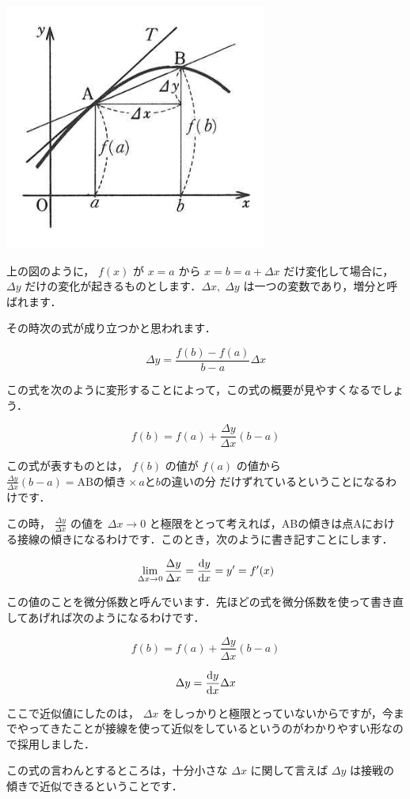 \documentclass[
  b4paperpaper,
  xelatex,ja=standard]{bxjsbook}
\begin{document}
\includegraphics{source/images/intro/intro-1.png}

上の図のように， \(f(x)\) が \(x=a\) から \(x=b=a+\Delta x\)
だけ変化して場合に， \(\Delta y\)
だけの変化が起きるものとします．\(\Delta x,\; \Delta y\)
は一つの変数であり，増分と呼ばれます．

その時次の式が成り立つかと思われます．

\[\Delta y = \frac{f(b)-f(a)}{b-a} \Delta x\]

この式を次のように変形することによって，この式の概要が見やすくなるでしょう．

\[ f(b) = f(a) + \frac{\Delta y}{\Delta x}(b-a) \]

この式が表すものとは， \(f(b)\) の値が \(f(a)\) の値から
\(\frac{\Delta y}{\Delta x}(b-a)=\text{ABの傾き}\times a\text{と}b\text{の違いの分}\)
だけずれているということになるわけです．

この時， \(\frac{\Delta y}{\Delta x}\) の値を \(\Delta x\to 0\)
と極限をとって考えれば，ABの傾きは点Aにおける接線の傾きになるわけです．このとき，次のように書き記すことにします．

\[\lim_{\Delta x \to 0}\frac{\Delta y}{\Delta x}=\dv{y}{x}=y'=f'(x)\]

この値のことを微分係数と呼んでいます．先ほどの式を微分係数を使って書き直してあげれば次のようになるわけです．

\[ f(b) = f(a) + \frac{\Delta y}{\Delta x}(b-a) \]

\[ \Delta y = \dv{y}{x} \Delta x\]

ここで近似値にしたのは， \(\Delta x\)
をしっかりと極限とっていないからですが，今までやってきたことが接線を使って近似をしているというのがわかりやすい形なので採用しました．

この式の言わんとするところは，十分小さな \(\Delta x\) に関して言えば
\(\Delta y\) は接戦の傾きで近似できるということです．
\end{document}
